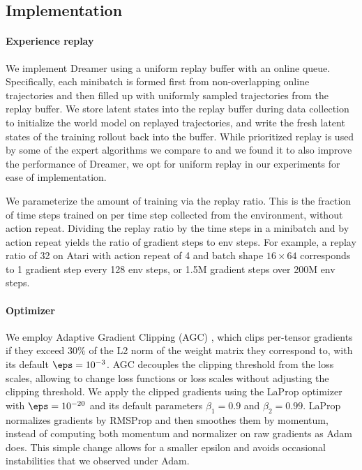 \vspace*{-3ex}
\subsection*{Implementation}

\paragraph{Experience replay}
We implement Dreamer using a uniform replay buffer with an online queue\citep{schmitt2020laser}. Specifically, each minibatch is formed first from non-overlapping online trajectories and then filled up with uniformly sampled trajectories from the replay buffer. We store latent states into the replay buffer during data collection to initialize the world model on replayed trajectories, and write the fresh latent states of the training rollout back into the buffer.
While prioritized replay\citep{schaul2015prioritized} is used by some of the expert algorithms we compare to and we found it to also improve the performance of Dreamer, we opt for uniform replay in our experiments for ease of implementation.

We parameterize the amount of training via the replay ratio. This is the fraction of time steps trained on per time step collected from the environment, without action repeat. Dividing the replay ratio by the time steps in a minibatch and by action repeat yields the ratio of gradient steps to env steps. For example, a replay ratio of 32 on Atari with action repeat of 4 and batch shape $16 \times 64$ corresponds to 1 gradient step every 128 env steps, or 1.5M gradient steps over 200M env steps.

\paragraph{Optimizer}
We employ Adaptive Gradient Clipping (AGC) \citep{brock2021agc}, which clips per-tensor gradients if they exceed $30\%$ of the L2 norm of the weight matrix they correspond to, with its default $\eps=10^{-3}$. AGC decouples the clipping threshold from the loss scales, allowing to change loss functions or loss scales without adjusting the clipping threshold. We apply the clipped gradients using the LaProp optimizer\citep{ziyin2020laprop} with $\eps=10^{-20}$ and its default parameters $\beta_1=0.9$ and $\beta_2=0.99$. LaProp normalizes gradients by RMSProp and then smoothes them by momentum, instead of computing both momentum and normalizer on raw gradients as Adam does\citep{kingma2014adam}. This simple change allows for a smaller epsilon and avoids occasional instabilities that we observed under Adam.

